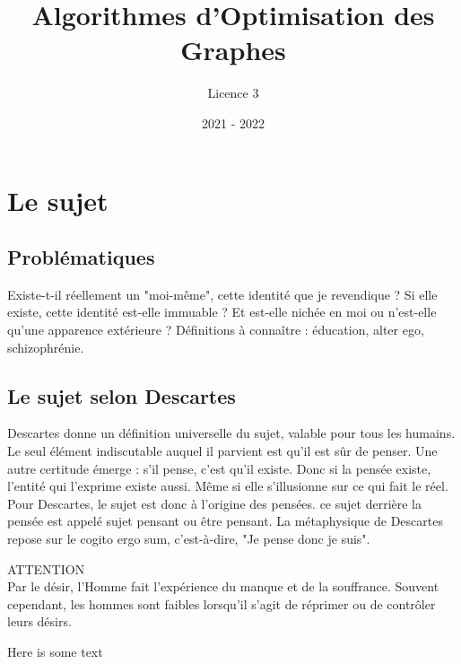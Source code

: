 \documentclass{article}%
\title{Algorithmes d'Optimisation des Graphes}%
\author{Licence 3}%
\date{2021 {-} 2022}%
\begin{document}
%
\normalsize%
\maketitle%
\tableofcontents%
\newpage%
\section{Le sujet}%
\label{sec:Lesujet}%

%
\subsection{Problématiques}%
\label{subsec:Problmatiques}%
Existe{-}t{-}il réellement un "moi{-}même", cette identité que je revendique ?%
\newline%
\newline%
Si elle existe, cette identité est{-}elle immuable ?%
\newline%
\newline%
Et est{-}elle nichée en moi ou n'est{-}elle qu'une apparence extérieure ?%
\newline%
\newline%
Définitions à connaître : éducation, alter ego, schizophrénie.

%
\subsection{Le sujet selon Descartes}%
\label{subsec:LesujetselonDescartes}%
Descartes donne un définition universelle du sujet, valable pour tous les humains. Le seul élément indiscutable auquel il parvient est qu'il est sûr de penser. Une autre certitude émerge : s'il pense, c'est qu'il existe. Donc si la pensée existe, l'entité qui l'exprime existe aussi. Même si elle s'illusionne sur ce qui fait le réel. Pour Descartes, le sujet est donc à l'origine des pensées. ce sujet derrière la pensée est appelé sujet pensant ou être pensant. La métaphysique de Descartes repose sur le cogito ergo sum, c'est{-}à{-}dire, "Je pense donc je suis".

\begin{tcolorbox}[colframe=danger, colback=danger-bg]
{ \footnotesize \textcolor{danger}{ATTENTION}}
\\ Par le désir, l'Homme fait l'expérience du manque et de la souffrance. Souvent cependant, les hommes sont faibles lorsqu'il s'agit de réprimer ou de contrôler leurs désirs.
\end{tcolorbox}

\begin{tcolorbox}[width=5cm]
Here is some text
\end{tcolorbox}
\end{document}
